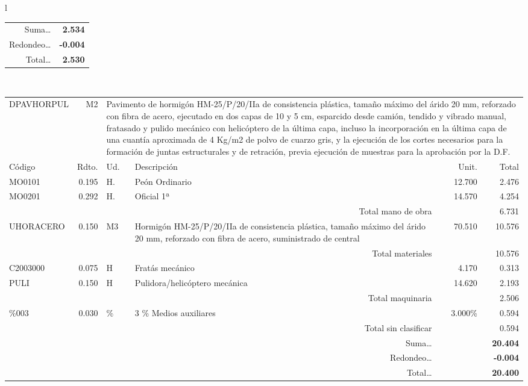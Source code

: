 \documentclass{book}%
\begin{document}
\begin{longtable}{l}
\begin{tabular}{l r l p{4cm} r r}
\multicolumn{4}{r}{Suma\ldots}&\multicolumn{2}{r}{\textbf{2.534}}\\%
\multicolumn{4}{r}{Redondeo\ldots}&\multicolumn{2}{r}{\textbf{{-}0.004}}\\%
\multicolumn{4}{r}{Total\ldots}&\multicolumn{2}{r}{\textbf{2.530}}\\%
\end{tabular}\\%
\begin{tabular}{l r l p{4cm} r r}%
DPAVHORPUL&M2&\multicolumn{4}{p{7cm}}{Pavimento de hormigón HM{-}25/P/20/IIa de consistencia plástica, tamaño máximo del árido 20 mm, reforzado con fibra de acero, ejecutado en dos capas de 10 y 5 cm, esparcido desde camión, tendido y vibrado manual, fratasado y pulido mecánico con helicóptero de la última capa, incluso la incorporación en la última capa de una cuantía aproximada de 4 Kg/m2 de polvo de cuarzo gris, y la ejecución de los cortes necesarios para la formación de juntas estructurales y de retración, previa ejecución de muestras para la aprobación por la D.F.}\\%
Código&Rdto.&Ud.&Descripción&Unit.&Total\\%
\hline%
MO0101&0.195&H.&Peón Ordinario&12.700&2.476\\%
MO0201&0.292&H.&Oficial 1ª&14.570&4.254\\%
\multicolumn{4}{r}{Total mano de obra}&&6.731\\%
UHORACERO&0.150&M3&Hormigón HM{-}25/P/20/IIa de consistencia plástica, tamaño máximo del árido 20 mm, reforzado con fibra de acero, suministrado de central&70.510&10.576\\%
\multicolumn{4}{r}{Total materiales}&&10.576\\%
C2003000&0.075&H&Fratás mecánico&4.170&0.313\\%
PULI&0.150&H&Pulidora/helicóptero mecánica&14.620&2.193\\%
\multicolumn{4}{r}{Total maquinaria}&&2.506\\%
\%003&0.030&\%&3 \% Medios auxiliares&3.000\%&0.594\\%
\multicolumn{4}{r}{Total sin clasificar}&&0.594\\%
\multicolumn{4}{r}{Suma\ldots}&\multicolumn{2}{r}{\textbf{20.404}}\\%
\multicolumn{4}{r}{Redondeo\ldots}&\multicolumn{2}{r}{\textbf{{-}0.004}}\\%
\multicolumn{4}{r}{Total\ldots}&\multicolumn{2}{r}{\textbf{20.400}}\\%
\end{tabular}\\%

\end{longtable}
\end{document}
